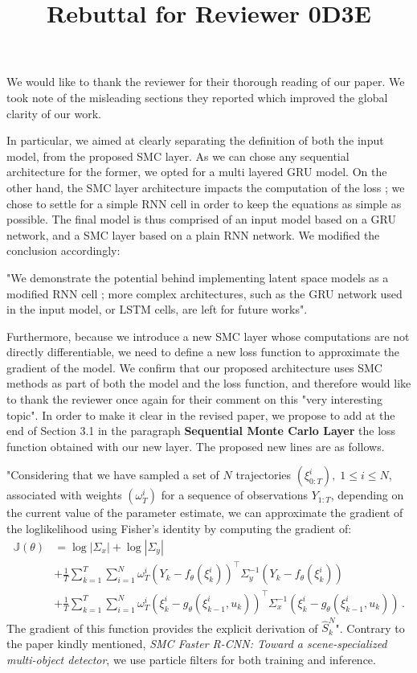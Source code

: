 \documentclass{article}
\title{Rebuttal for Reviewer 0D3E}
\date{}
\begin{document}

We would like to thank the reviewer for their thorough reading of our paper.
We took note of the misleading sections they reported which improved the global clarity of our work.

In particular, we aimed at clearly separating the definition of both the input model, from the proposed SMC layer.
As we can chose any sequential architecture for the former, we opted for a multi layered GRU model.
On the other hand, the SMC layer architecture impacts the computation of the loss ; we chose to settle for a simple RNN cell in order to keep the equations as simple as possible.
The final model is thus comprised of an input model based on a GRU network, and a SMC layer based on a plain RNN network.
We modified the conclusion accordingly: 

"We demonstrate the potential behind implementing latent space models as a modified RNN cell ; more complex architectures, such as the GRU network used in the input model, or LSTM cells, are left for future works".


Furthermore, because we introduce a new SMC layer whose computations are not directly differentiable, we need to define a new loss function to approximate the gradient of the model.
We confirm that our proposed architecture uses SMC methods as part of both the model and the loss function, and therefore would like to thank the reviewer once again for their comment on this "very interesting topic".
In order to make it clear in the revised  paper, we propose to add at the end of Section 3.1 in the paragraph {\bf Sequential Monte Carlo Layer} the loss function obtained with our new layer. The proposed new lines are as follows. 

"Considering that we have sampled a set of $N$ trajectories $(\xi^i_{0:T}),\;1 \leq i \leq N$, associated with weights $(\omega_T^i)$ for a sequence of observations $Y_{1:T}$, depending on the current value of the parameter estimate, we can approximate the gradient of the loglikelihood using Fisher's identity by computing the gradient of:
	\begin{align*}
		\mathbb{J}(\theta) & = \log |\Sigma_x| + \log |\Sigma_y|                                                                                                        \\
		                   & + \frac{1}{T}\sum_{k=1}^T \sum_{i=1}^N \omega_T^i (Y_k - f_\theta(\xi_k^i))^{\top} \Sigma_y^{-1} (Y_k - f_\theta(\xi_k^i))                         \\
		                   & + \frac{1}{T}\sum_{k=1}^T \sum_{i=1}^N \omega_T^i (\xi_k^i - g_\theta(\xi_{k-1}^i, u_k))^\top\Sigma_x^{-1}(\xi_k^i - g_\theta(\xi_{k-1}^i, u_k))\,.
	\end{align*}
The gradient of this function provides the explicit derivation of  $\widehat{S}_k^N$".
Contrary to the paper kindly mentioned, \textit{SMC Faster R-CNN: Toward a scene-specialized multi-object detector}, we use particle filters for both training and inference.




\end{document}

